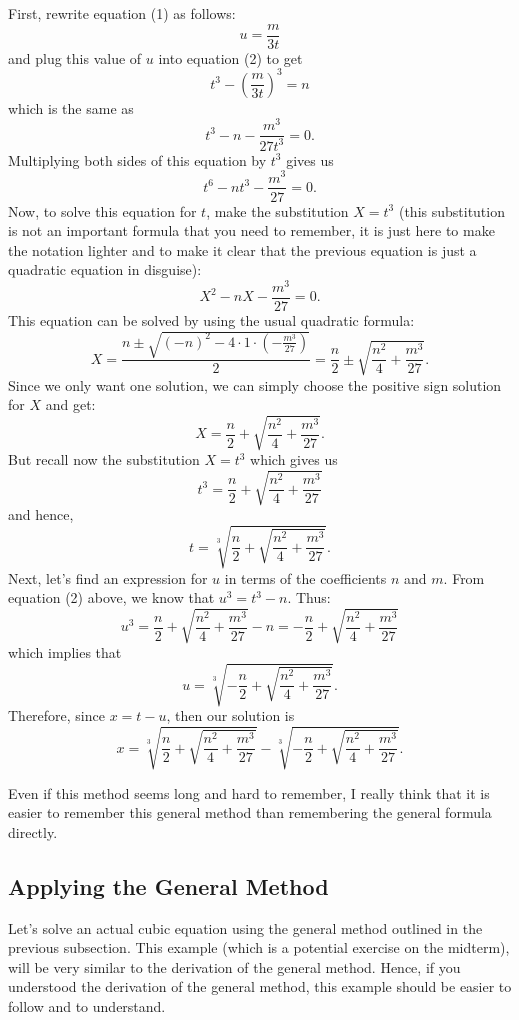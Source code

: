 \documentclass{article}
\theoremstyle{plain}
\theoremstyle{definition}
\begin{document}
First, rewrite equation (1) as follows:
$$u = \frac{m}{3t}$$
and plug this value of $u$ into equation (2) to get
$$t^3 - \left(\frac{m}{3t}\right)^3 = n$$
which is the same as
$$t^3 - n - \frac{m^3}{27t^3} = 0.$$
Multiplying both sides of this equation by $t^3$ gives us
$$t^6 - nt^3 - \frac{m^3}{27} = 0.$$
Now, to solve this equation for $t$, make the substitution $X = t^3$ (this substitution is not an important formula that you need to remember, it is just here to make the notation lighter and to make it clear that the previous equation is just a quadratic equation in disguise):
$$X^2 - nX - \frac{m^3}{27} = 0.$$
This equation can be solved by using the usual quadratic formula:
$$X = \frac{n \pm \sqrt{(-n)^2 - 4\cdot 1 \cdot \left(-\frac{m^3}{27}\right)}}{2} = \frac{n}{2} \pm \sqrt{\frac{n^2}{4} + \frac{m^3}{27}}.$$
Since we only want one solution, we can simply choose the positive sign solution for $X$ and get:
$$X = \frac{n}{2} + \sqrt{\frac{n^2}{4} + \frac{m^3}{27}}.$$
But recall now the substitution $X = t^3$ which gives us
$$t^3 = \frac{n}{2} + \sqrt{\frac{n^2}{4} + \frac{m^3}{27}}$$
and hence,
$$t = \sqrt[3]{\frac{n}{2} + \sqrt{\frac{n^2}{4} + \frac{m^3}{27}}}.$$
Next, let's find an expression for $u$ in terms of the coefficients $n$ and $m$. From equation (2) above, we know that $u^3 = t^3 - n$. Thus:
$$u^3 =  \frac{n}{2} + \sqrt{\frac{n^2}{4} + \frac{m^3}{27}} - n =  -\frac{n}{2} + \sqrt{\frac{n^2}{4} + \frac{m^3}{27}}$$
which implies that
$$u = \sqrt[3]{-\frac{n}{2} + \sqrt{\frac{n^2}{4} + \frac{m^3}{27}}}.$$
Therefore, since $x = t-u$, then our solution is 
$$x = \sqrt[3]{\frac{n}{2} + \sqrt{\frac{n^2}{4} + \frac{m^3}{27}}} - \sqrt[3]{-\frac{n}{2} + \sqrt{\frac{n^2}{4} + \frac{m^3}{27}}}.$$

Even if this method seems long and hard to remember, I really think that it is easier to remember this general method than remembering the general formula directly.

\subsection*{Applying the General Method}

Let's solve an actual cubic equation using the general method outlined in the previous subsection. This example (which is a potential exercise on the midterm), will be very similar to the derivation of the general method. Hence, if you understood the derivation of the general method, this example should be easier to follow and to understand.
\end{document}
